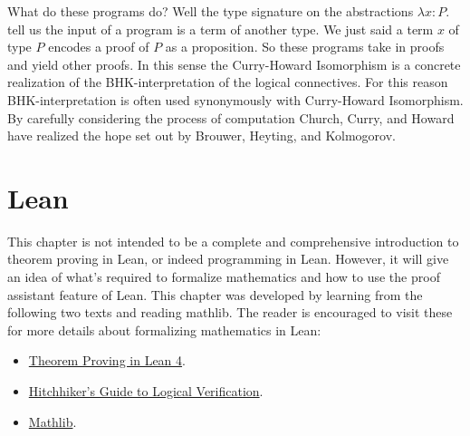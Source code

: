 \documentclass{book}
\begin{document}
    What do these programs do? Well the type signature on the abstractions $\lambda x : P. \ $ tell us the input of a program is a term of another type. We just said a term $x$ of type $P$ encodes a proof of $P$ as a proposition. So these programs take in proofs and yield other proofs. In this sense the Curry-Howard Isomorphism is a concrete realization of the BHK-interpretation of the logical connectives. For this reason BHK-interpretation is often used synonymously with Curry-Howard Isomorphism. By carefully considering the process of computation Church, Curry, and Howard have realized the hope set out by Brouwer, Heyting, and Kolmogorov.

































\chapter{Lean}

    This chapter is not intended to be a complete and comprehensive introduction to theorem proving in Lean, or indeed programming in Lean. However, it will give an idea of what's required to formalize mathematics and how to use the proof assistant feature of Lean. This chapter was developed by learning from the following two texts and reading mathlib. The reader is encouraged to visit these for more details about formalizing mathematics in Lean: 

    \begin{itemize}
        \item \href{https://lean-lang.org/theorem_proving_in_lean4/propositions_and_proofs.html}{Theorem Proving in Lean 4}.
        \item \href{https://github.com/blanchette/logical_verification_2023/blob/main/hitchhikers_guide.pdf}{Hitchhiker's Guide to Logical Verification}.
        \item \href{https://github.com/leanprover-community/mathlib4/tree/master/Mathlib}{Mathlib}.
    \end{itemize}
\end{document}
